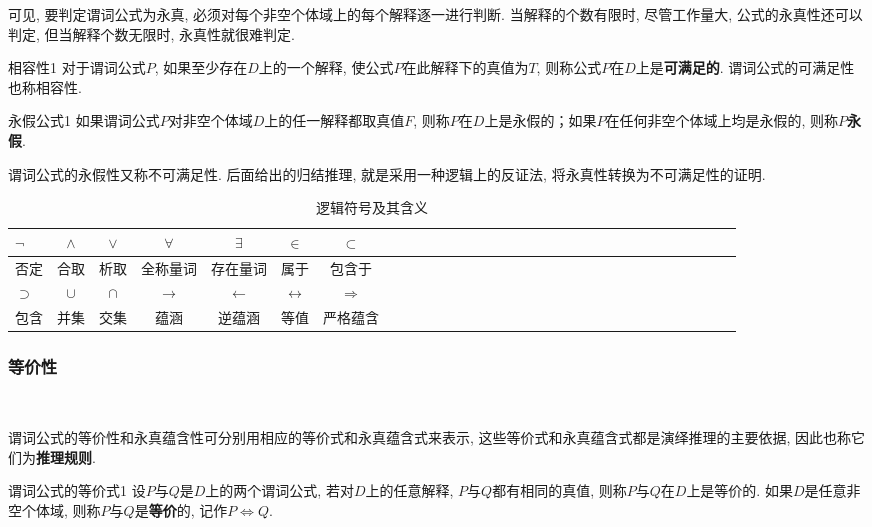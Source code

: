 可见, 要判定谓词公式为永真, 必须对每个非空个体域上的每个解释逐一进行判断. 当解释的个数有限时, 尽管工作量大, 公式的永真性还可以判定, 但当解释个数无限时, 永真性就很难判定.
\begin{mydef}{相容性}{1}
对于谓词公式$P$, 如果至少存在$D$上的一个解释, 使公式$P$在此解释下的真值为$T$, 则称公式$P$在$D$上是\textbf{可满足的}.
谓词公式的可满足性也称相容性.
\end{mydef}
\begin{mydef}{永假公式}{1}
如果谓词公式$P$对非空个体域$D$上的任一解释都取真值$F$, 则称$P$在$D$上是永假的；如果$P$在任何非空个体域上均是永假的, 则称\textbf{$P$永假}.
\end{mydef}
\begin{remark}
  谓词公式的永假性又称不可满足性. 后面给出的归结推理, 就是采用一种逻辑上的反证法, 将永真性转换为不可满足性的证明.
\end{remark}
\begin{table}[H]
\caption{逻辑符号及其含义}
\vspace{-0.3cm}
\begin{center}
\begin{tabular} {lccccccccccccccccccccccccccccccc}
\hline
$\neg$&$\wedge$&$\vee$&$\forall$&$\exists$&$\in$&$\subset$\\
\hline
否定	&合取&析取&全称量词&存在量词&属于&包含于\\
\hline
$\supset$&$\cup$&$\cap$&$\rightarrow$&$\leftarrow$&$\leftrightarrow$&$\Rightarrow$\\
\hline
包含&并集&交集&蕴涵&逆蕴涵&等值&严格蕴含\\
\hline
\end{tabular}
\end{center}
\label{AItable202020020101}
\end{table}
\subsubsection{等价性}~{}

谓词公式的等价性和永真蕴含性可分别用相应的等价式和永真蕴含式来表示, 这些等价式和永真蕴含式都是演绎推理的主要依据, 因此也称它们为\textbf{推理规则}.

\begin{mydef}{谓词公式的等价式}{1}
设$P$与$Q$是$D$上的两个谓词公式, 若对$D$上的任意解释, $P$与$Q$都有相同的真值, 则称$P$与$Q$在$D$上是等价的. 如果$D$是任意非空个体域, 则称$P$与$Q$是\textbf{等价}的, 记作$P\Leftrightarrow Q$.
\end{mydef}

